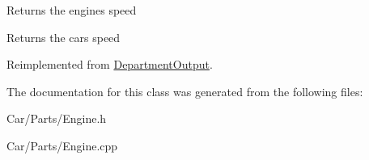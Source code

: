 Returns the engines speed \begin{DoxyReturn}{Returns}
the cars speed 
\end{DoxyReturn}


Reimplemented from \hyperlink{classDepartmentOutput_a90caf8934a687d18b9855f19a421ecef}{Department\+Output}.



The documentation for this class was generated from the following files\+:\begin{DoxyCompactItemize}
\item 
Car/\+Parts/Engine.\+h\item 
Car/\+Parts/Engine.\+cpp\end{DoxyCompactItemize}
